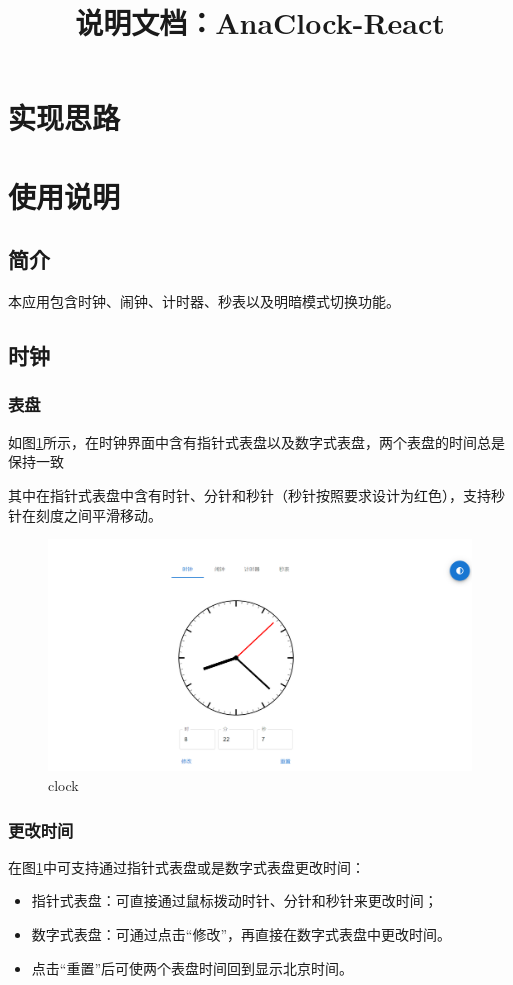 \documentclass[a4paper,11pt]{article}
\title{说明文档：AnaClock-React}
\date{}
\begin{document}
\maketitle

\tableofcontents
\newpage
\section{实现思路}
\section{使用说明}
\subsection{简介}
本应用包含时钟、闹钟、计时器、秒表以及明暗模式切换功能。

\subsection{时钟}
\subsubsection{表盘}
如图\ref{fig:clock}所示，在时钟界面中含有指针式表盘以及数字式表盘，两个表盘的时间总是保持一致

其中在指针式表盘中含有时针、分针和秒针（秒针按照要求设计为红色），支持秒针在刻度之间平滑移动。
\begin{figure}[!h]
    \centering
    \begin{minipage}{0.7\textwidth}
        \centering
        \includegraphics[width=\linewidth]{image/clock.png}
        \caption{clock}
            \label{fig:clock}
    \end{minipage}
\end{figure}
\subsubsection{更改时间}
在图\ref{fig:clock}中可支持通过指针式表盘或是数字式表盘更改时间：
\begin{itemize}
  \item 指针式表盘：可直接通过鼠标拨动时针、分针和秒针来更改时间；
  \item 数字式表盘：可通过点击“修改”，再直接在数字式表盘中更改时间。
  \item 点击“重置”后可使两个表盘时间回到显示北京时间。
\end{itemize}
\end{document}
